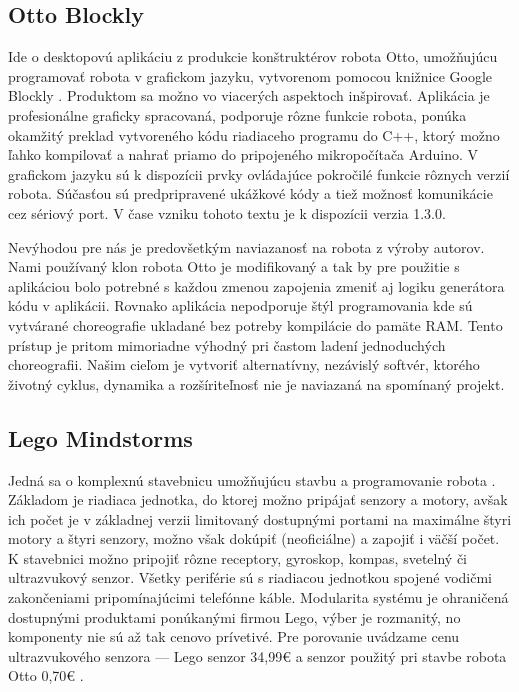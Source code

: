 \subsection{Otto Blockly}
\label{sub:OttoBlockly}
Ide o desktopovú aplikáciu z produkcie konštruktérov robota Otto, umožňujúcu programovať robota v grafickom jazyku, vytvorenom pomocou knižnice Google Blockly \cite{OttoBlockly}. Produktom sa možno vo viacerých aspektoch inšpirovať. Aplikácia je profesionálne graficky spracovaná, podporuje rôzne funkcie robota, ponúka okamžitý preklad vytvoreného kódu riadiaceho programu do C++, ktorý možno ľahko kompilovať a nahrať priamo do pripojeného mikropočítača Arduino. V grafickom jazyku sú k dispozícii prvky ovládajúce pokročilé funkcie rôznych verzií robota. Súčasťou sú predpripravené ukážkové kódy a tiež možnosť komunikácie cez sériový port. V čase vzniku tohoto textu je k dispozícii verzia 1.3.0.

Nevýhodou pre nás je predovšetkým naviazanosť na robota z výroby autorov. Nami používaný klon robota Otto je modifikovaný a tak by pre použitie s aplikáciou bolo potrebné s každou zmenou zapojenia zmeniť aj logiku generátora kódu v aplikácii. Rovnako aplikácia nepodporuje štýl programovania kde sú vytvárané choreografie ukladané bez potreby kompilácie do pamäte RAM. Tento prístup je pritom mimoriadne výhodný pri častom ladení jednoduchých choreografii. Našim cieľom je vytvoriť alternatívny, nezávislý softvér, ktorého životný cyklus, dynamika a rozšíriteľnosť nie je naviazaná na spomínaný projekt.

\subsection{Lego Mindstorms}
\label{sub:LegoMindstorms}
Jedná sa o komplexnú stavebnicu umožňujúcu stavbu a programovanie robota \cite{LegoMindstormsEducationSet}. Základom je riadiaca jednotka, do ktorej možno pripájať senzory a motory, avšak ich počet je v základnej verzii limitovaný dostupnými portami na maximálne štyri motory a štyri senzory, možno však dokúpiť (neoficiálne)  a zapojiť i väčší počet. K stavebnici možno pripojiť rôzne receptory, gyroskop, kompas, svetelný či ultrazvukový senzor. Všetky periférie sú s riadiacou jednotkou spojené vodičmi zakončeniami pripomínajúcimi telefónne káble. Modularita systému je ohraničená dostupnými produktami ponúkanými firmou Lego, výber je rozmanitý, no komponenty nie sú až tak cenovo prívetivé. Pre porovanie uvádzame cenu ultrazvukového senzora --- Lego senzor 34,99€ \cite{LegoMindstormsUltrasonic} a senzor použitý pri stavbe robota Otto 0,70€ \cite{OttoUltrasonic}.

